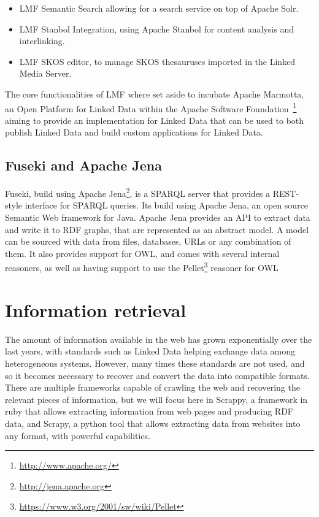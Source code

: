 \begin{itemize}%
  \item \ac{LMF} Semantic Search allowing for a search service on top of Apache Solr. 
  \item \ac{LMF} Stanbol Integration, using Apache Stanbol for content analysis and interlinking.
  \item \ac{LMF} SKOS editor, to manage SKOS thesauruses imported in the Linked Media Server.
\end{itemize}

The core functionalities of \ac{LMF} where set aside to incubate Apache Marmotta, an Open Platform for Linked Data within the Apache Software Foundation~\footnote{\url{http://www.apache.org/}} aiming to provide an implementation for Linked Data that can be used to both publish Linked Data and build custom applications for Linked Data.

\subsection{Fuseki and Apache Jena}

Fuseki, build using Apache Jena\footnote{\url{http://jena.apache.org}}, is a \ac{SPARQL} server that provides a REST-style interface for \ac{SPARQL} queries. Its build using Apache Jena, an open source Semantic Web framework for Java. Apache Jena provides an API to extract data and write it to \ac{RDF} graphs, that are represented as an abstract model. A model can be sourced with data from files, databases, URLs or any combination of them. It also provides support for \ac{OWL}, and comes with several internal reasoners, as well as having support to use the Pellet\footnote{\url{https://www.w3.org/2001/sw/wiki/Pellet}} reasoner for \ac{OWL}




\section{Information retrieval}

The amount of information available in the web has grown exponentially over the last years, with standards such as Linked Data helping exchange data among heterogeneous systems. However, many times these standards are not used, and so it becomes necessary to recover and convert the data into compatible formats. There are multiple frameworks capable of crawling the web and recovering the relevant pieces of information, but we will focus here in Scrappy, a framework in ruby that allows extracting information from web pages and producing RDF data, and Scrapy, a python tool that allows extracting data from websites into any format, with powerful capabilities.

